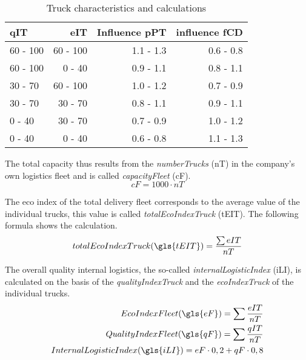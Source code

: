 \begin{table}[ht]
    \centering
    \begin{tabular}{|l|r|r|r|}
    \hline
    \textbf{qIT} & \textbf{eIT} & \textbf{Influence pPT} & \textbf{influence fCD} \\ \hline
    60 - 100      & 60 - 100   & 1.1 - 1.3   & 0.6 - 0.8       \\
    60 - 100      & 0 - 40     & 0.9 - 1.1   & 0.8 - 1.1       \\
    30 - 70       & 60 - 100   & 1.0 - 1.2   & 0.7 - 0.9       \\
    30 - 70       & 30 - 70    & 0.8 - 1.1   & 0.9 - 1.1       \\
    0 - 40        & 30 - 70    & 0.7 - 0.9   & 1.0 - 1.2       \\
    0 - 40        & 0 - 40     & 0.6 - 0.8   & 1.1 - 1.3       \\
    \hline
    \end{tabular}
    \caption{Truck characteristics and calculations}
    \label{Truck_characteristics}
\end{table}

The total capacity thus results from the \textit{numberTrucks} (\gls{nT}) in the company's own logistics fleet and is called \textit{capacityFleet} (\gls{cF}). 
\begin{equation}
\label{func:capacityFleet}
    cF = 1000 \cdot nT
\end{equation}

The eco index of the total delivery fleet corresponds to the average value of the individual trucks, this value is called \textit{totalEcoIndexTruck} (\gls{tEIT}). The following formula shows the calculation. 
\begin{equation}
    totalEcoIndexTruck (\gls{tEIT})= \frac{\sum eIT }{nT}  
\end{equation}

The overall quality internal logistics, the so-called \textit{internalLogisticIndex} (\gls{iLI}), is calculated on the basis of the \textit{qualityIndexTruck} and the \textit{ecoIndexTruck} of the individual trucks.
\begin{equation}
\label{func:internalLogisticIndex}
\begin{aligned}
    Eco Index Fleet (\gls{eF}) = \sum \frac{eIT}{nT} \\
    Quality Index Fleet (\gls{qF}) = \sum \frac{qIT}{nT}\\
    Internal Logistic Index (\gls{iLI}) = eF \cdot 0,2 + qF \cdot 0,8 \\
\end{aligned}
\end{equation}

